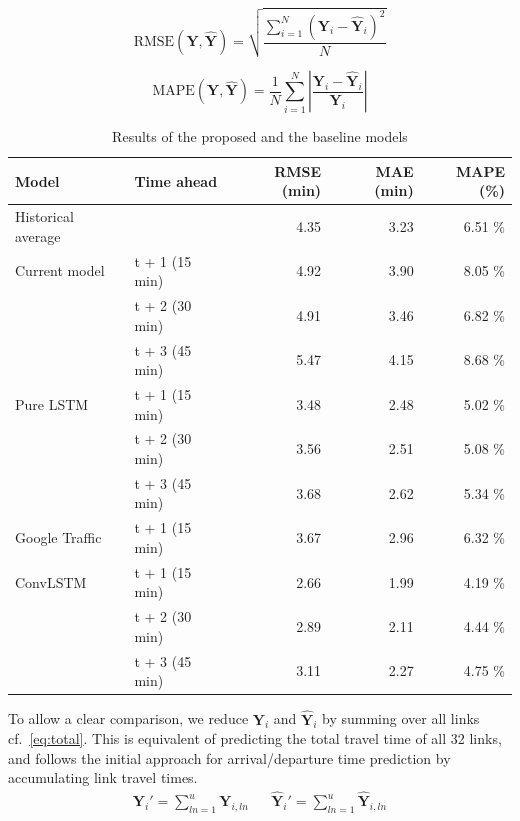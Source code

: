 ﻿\documentclass[preprint,11pt,5p,twocolumn]{elsarticle}
\newcommand{\matr}[1]{\mathbf{#1}}
\begin{document}
\begin{equation}
    \textrm{RMSE}(\matr{Y}, \matr{\widehat{Y}}) = \sqrt{\frac{\sum_{i = 1}^{N} \left(\matr{Y}_i - \matr{\widehat{Y}}_i \right)^2}{N}}
    \label{eq:rmse}
\end{equation}

\begin{equation}
    \textrm{MAPE}(\matr{Y}, \matr{\widehat{Y}}) = \frac{1}{N} \sum_{i = 1}^{N} \left| \frac{\matr{Y}_i - \matr{\widehat{Y}}_i}{\matr{Y}_i} \right| 
    \label{eq:mape} 
\end{equation}
\vspace{.5em}

\begin{table}[!t]
    \center
    \begin{tabular}{ll|rrr}
        Model & Time ahead & RMSE (min) & MAE (min) & MAPE (\%) \\
        \hline         
        \hline
        Historical average &                & 4.35 & 3.23 & 6.51 \% \\ 
        \hline 
        Current model      & t + 1 (15 min) & 4.92 & 3.90 & 8.05 \% \\
                           & t + 2 (30 min) & 4.91 & 3.46 & 6.82 \% \\
                           & t + 3 (45 min) & 5.47 & 4.15 & 8.68 \% \\
        \hline 
        Pure LSTM          & t + 1 (15 min) & 3.48 & 2.48 & 5.02 \% \\
                           & t + 2 (30 min) & 3.56 & 2.51 & 5.08 \% \\
                           & t + 3 (45 min) & 3.68 & 2.62 & 5.34 \% \\
        \hline 
        Google Traffic     & t + 1 (15 min) & 3.67 & 2.96 & 6.32 \% \\ 
        \hline 
        ConvLSTM           & t + 1 (15 min) & 2.66 & 1.99 & 4.19 \% \\
                           & t + 2 (30 min) & 2.89 & 2.11 & 4.44 \% \\
                           & t + 3 (45 min) & 3.11 & 2.27 & 4.75 \% \\
        \hline 
    \end{tabular}
    \caption{Results of the proposed and the baseline models}
    \label{tab:results}
\end{table}

To allow a clear comparison, we reduce $\matr{Y}_i$ and $\matr{\widehat{Y}}_i$ by summing over all links cf.~\cref{eq:total}. This is equivalent of predicting the total travel time of all 32 links, and follows the initial approach for arrival/departure time prediction by accumulating link travel times.
\begin{align}
    \matr{Y}_i' = \sum_{\mathit{ln} = 1}^{u} \matr{Y}_{i,\mathit{ln}} & & \matr{\widehat{Y}}_i' = \sum_{\mathit{ln} = 1}^{u} \matr{\widehat{Y}}_{i,\mathit{ln}}
    \label{eq:total} 
\end{align}
\end{document}
